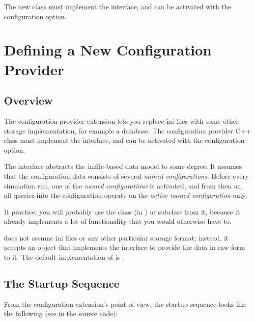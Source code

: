The new class must implement the  interface, and
can be activated with the  configuration
option.


\section{Defining a New Configuration Provider}
\label{sec:plugin-exts:configuration}

\subsection{Overview}

The configuration provider extension lets you replace ini files
with some other storage implementation, for example a database.
The configuration provider C++ class must implement the
 interface, and can be activated with
the  configuration option.

The  interface abstracts the inifile-based
data model to some degree. It assumes that the configuration data
consists of several \textit{named configurations}. Before every
simulation run, one of the \textit{named configurations} is
activated, and from then on, all queries into the configuration
operate on the \textit{active named configuration} only.

It practice, you will probably use the 
class (in ) or subclass from it, because it already
implements a lot of functionality that you would otherwise have to.

 does not assume ini files or
any other particular storage format; instead, it accepts
an object that implements the 
interface to provide the data in raw form to it.
The default implementation of  is
.

\subsection{The Startup Sequence}

From the configuration extension's point of view, the startup sequence
looks like the following (see  in the source code):

